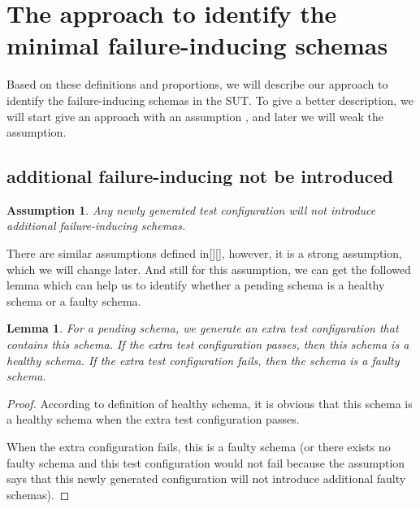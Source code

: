 \documentclass[10pt,journal,cspaper,compsoc]{IEEEtran}
\begin{document}
\section{The approach to identify the minimal failure-inducing schemas}
Based on these definitions and proportions, we will describe our approach to identify the failure-inducing schemas in the SUT. To give a better description, we will start give an approach with an assumption , and later we will weak the assumption.
\subsection{additional failure-inducing not be introduced}
\newtheorem{assumption}{Assumption}
\begin{assumption}
Any newly generated test configuration will not introduce additional failure-inducing schemas.
\end{assumption}

There are similar assumptions defined in[][], however, it is a strong assumption, which we will change later. And still for this assumption, we can get the followed lemma which can help us to identify whether a pending schema is a healthy schema or a faulty schema.
\newtheorem{lemma}{Lemma}
\begin{lemma}
For a pending schema, we generate an extra test configuration that contains this schema. If the extra test configuration passes, then this schema is a healthy schema. If the extra test configuration fails, then the schema is a faulty schema.
\end{lemma}
\begin{proof}
According to definition of healthy schema, it is obvious that this schema is a healthy schema when the extra test configuration passes.

When the extra configuration fails, this is a faulty schema (or there exists no faulty schema and this test configuration would not fail because the assumption says that this newly generated configuration will not introduce additional faulty schemas).
\end{proof}
\end{document}
